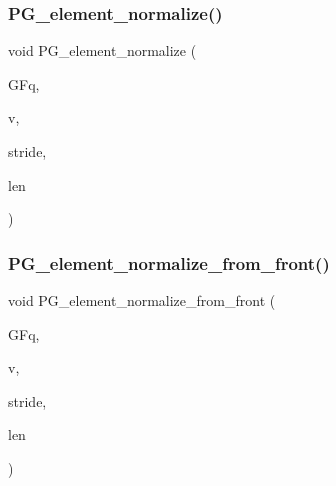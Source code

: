 \mbox{\label{projective_8_c_a5a4c3c1158bad6bab0d786c616bd0996}} 
\subsubsection{\texorpdfstring{P\+G\+\_\+element\+\_\+normalize()}{PG\_element\_normalize()}}
{\footnotesize\ttfamily void P\+G\+\_\+element\+\_\+normalize (\begin{DoxyParamCaption}\item[{\mbox{\hyperlink{classfinite__field}{finite\+\_\+field}} \&}]{G\+Fq,  }\item[{\mbox{\hyperlink{galois_8h_a09fddde158a3a20bd2dcadb609de11dc}{I\+NT}} $\ast$}]{v,  }\item[{\mbox{\hyperlink{galois_8h_a09fddde158a3a20bd2dcadb609de11dc}{I\+NT}}}]{stride,  }\item[{\mbox{\hyperlink{galois_8h_a09fddde158a3a20bd2dcadb609de11dc}{I\+NT}}}]{len }\end{DoxyParamCaption})}

\mbox{\label{projective_8_c_af675caf5f9975573455c8d93cb56bf95}} 
\subsubsection{\texorpdfstring{P\+G\+\_\+element\+\_\+normalize\+\_\+from\+\_\+front()}{PG\_element\_normalize\_from\_front()}}
{\footnotesize\ttfamily void P\+G\+\_\+element\+\_\+normalize\+\_\+from\+\_\+front (\begin{DoxyParamCaption}\item[{\mbox{\hyperlink{classfinite__field}{finite\+\_\+field}} \&}]{G\+Fq,  }\item[{\mbox{\hyperlink{galois_8h_a09fddde158a3a20bd2dcadb609de11dc}{I\+NT}} $\ast$}]{v,  }\item[{\mbox{\hyperlink{galois_8h_a09fddde158a3a20bd2dcadb609de11dc}{I\+NT}}}]{stride,  }\item[{\mbox{\hyperlink{galois_8h_a09fddde158a3a20bd2dcadb609de11dc}{I\+NT}}}]{len }\end{DoxyParamCaption})}

